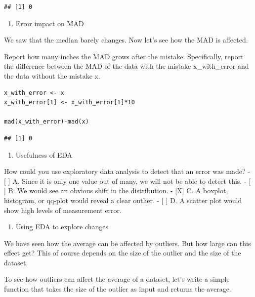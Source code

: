 \documentclass[
]{article}
\providecommand{\tightlist}{%
  \setlength{\itemsep}{0pt}\setlength{\parskip}{0pt}}
\begin{document}
\begin{verbatim}
## [1] 0
\end{verbatim}

\begin{enumerate}
\def\labelenumi{\arabic{enumi}.}
\setcounter{enumi}{5}
\tightlist
\item
  Error impact on MAD
\end{enumerate}

We saw that the median barely changes. Now let's see how the MAD is
affected.

Report how many inches the MAD grows after the mistake. Specifically,
report the difference between the MAD of the data with the mistake
x\_with\_error and the data without the mistake x.

\begin{verbatim}
x_with_error <- x
x_with_error[1] <- x_with_error[1]*10

mad(x_with_error)-mad(x)
\end{verbatim}

\begin{verbatim}
## [1] 0
\end{verbatim}

\begin{enumerate}
\def\labelenumi{\arabic{enumi}.}
\setcounter{enumi}{6}
\tightlist
\item
  Usefulness of EDA
\end{enumerate}

How could you use exploratory data analysis to detect that an error was
made? - {[} {]} A. Since it is only one value out of many, we will not
be able to detect this. - {[} {]} B. We would see an obvious shift in
the distribution. - {[}X{]} C. A boxplot, histogram, or qq-plot would
reveal a clear outlier. - {[} {]} D. A scatter plot would show high
levels of measurement error.

\begin{enumerate}
\def\labelenumi{\arabic{enumi}.}
\setcounter{enumi}{7}
\tightlist
\item
  Using EDA to explore changes
\end{enumerate}

We have seen how the average can be affected by outliers. But how large
can this effect get? This of course depends on the size of the outlier
and the size of the dataset.

To see how outliers can affect the average of a dataset, let's write a
simple function that takes the size of the outlier as input and returns
the average.
\end{document}
